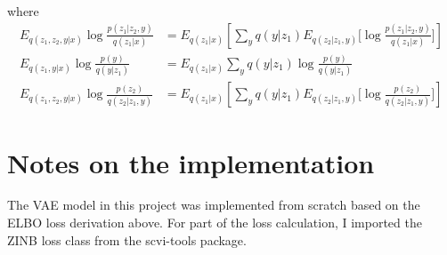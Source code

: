 \documentclass{article}
\begin{document}
where 
\begin{align}
E_{q(z_1, z_2, y|x)} \log \frac{p(z_1|z_2, y)}{q(z_1|x)} &= E_{q(z_1|x)}\left[\sum_y q(y|z_1)E_{q(z_2|z_1, y)} \big[ \log \frac{p(z_1 | z_2, y)}{q(z_1|x)} \big] \right] \\
E_{q(z_1, y|x)} \log \frac{p(y)}{q(y|z_1)} &= E_{q(z_1|x)} \sum_y q(y|z_1) \log \frac{p(y)}{q(y|z_1)} \\
E_{q(z_1,z_2, y |x)} \log \frac{p(z_2)}{q(z_2|z_1, y)} &= E_{q(z_1|x)}\left[\sum_y q(y|z_1)E_{q(z_2|z_1, y)} \big[ \log \frac{p(z_2)}{q(z_2|z_1, y)} \big] \right]
\end{align}

\section{Notes on the implementation}
The VAE model in this project was implemented from scratch based on the ELBO loss derivation above. For part of the loss calculation, I imported the ZINB loss class from the scvi-tools package.
\end{document}

